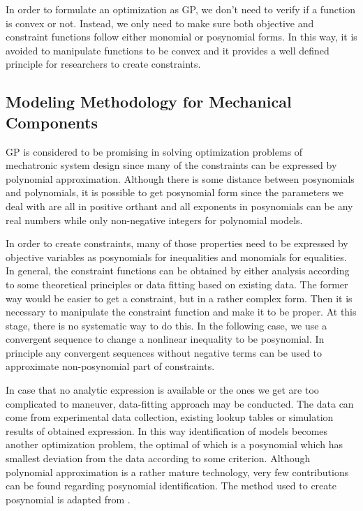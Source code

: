 In order to formulate an optimization as GP, we don't need to verify if a function is convex or not. Instead, we only need to make sure both objective and constraint functions follow either monomial or posynomial forms. In this way, it is avoided to manipulate functions to be convex and it provides a well defined principle for researchers to create constraints.

\subsection{Modeling Methodology for Mechanical Components}
GP is considered to be promising in solving optimization problems of mechatronic system design since many of the constraints can be expressed by polynomial approximation. Although there is some distance between posynomials and polynomials, it is possible to get posynomial form since the parameters we deal with are all in positive orthant and all exponents in posynomials can be any real numbers while only non-negative integers for polynomial models. 

In order to create constraints, many of those properties need to be expressed by objective variables as posynomials for inequalities and monomials for equalities. In general, the constraint functions can be obtained by either analysis according to some theoretical principles or data fitting based on existing data. The former way would be easier to get a constraint, but in a rather complex form. Then it is necessary to manipulate the constraint function and make it to be proper. At this stage, there is no systematic way to do this. In the following case, we use a convergent sequence to change a nonlinear inequality to be posynomial. In principle any convergent sequences without negative terms can be used to approximate non-posynomial part of constraints. 
 
In case that no analytic expression is available or the ones we get are too complicated to maneuver, data-fitting approach may be conducted. The data can come from experimental data collection, existing lookup tables or simulation results of obtained expression. In this way identification of models becomes another optimization problem, the optimal of which is a posynomial which has smallest deviation from the data according to some criterion. Although polynomial approximation is a rather mature technology, very few contributions can be found regarding posynomial identification. The method used to create posynomial is adapted from \cite{Posynomial2015}. 

